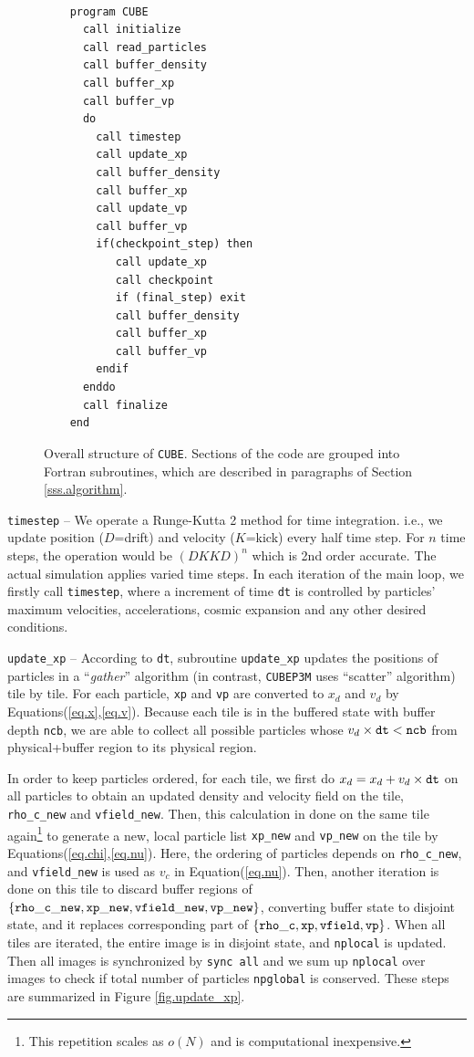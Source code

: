 \documentclass[10pt,twocolumn,preprint]{emulateapj}
\begin{document}
\begin{figure}[t]
\begin{verbatim}

    program CUBE
      call initialize
      call read_particles
      call buffer_density
      call buffer_xp
      call buffer_vp
      do
        call timestep
        call update_xp
        call buffer_density
        call buffer_xp
        call update_vp
        call buffer_vp
        if(checkpoint_step) then
           call update_xp
           call checkpoint
           if (final_step) exit
           call buffer_density
           call buffer_xp
           call buffer_vp
        endif
      enddo
      call finalize
    end
\end{verbatim}
\caption{Overall structure of {\tt CUBE}. Sections of the code are grouped into Fortran subroutines, which are described in paragraphs of Section \ref{sss.algorithm}.}
\label{fig.code}
\end{figure}


{\tt timestep} --
We operate a Runge-Kutta 2 method for time integration. i.e., we update position ($D$=drift) and velocity ($K$=kick) every half time step. For $n$ time steps, the operation would be $(DKKD)^n$ which is 2nd order accurate. The actual simulation applies varied time steps. In each iteration of the main loop, we firstly call {\tt timestep}, where a increment of time {\tt dt} is controlled by particles' maximum velocities, accelerations, cosmic expansion and any other desired conditions.

{\tt update\_xp} --
According to {\tt dt}, subroutine {\tt update\_xp} updates the positions of particles in a ``{\it gather}'' algorithm (in contrast, {\tt CUBEP3M} uses ``scatter'' algorithm) tile by tile. For each particle, {\tt xp} and {\tt vp} are converted to $x_d$ and $v_d$ by Equations(\ref{eq.x},\ref{eq.v}). Because each tile is in the buffered state with buffer depth {\tt ncb}, we are able to collect all possible particles whose $v_d\times{\tt dt}<{\tt ncb}$ from physical+buffer region to its physical region.

In order to keep particles ordered, for each tile, we first do $x_d=x_d+v_d\times{\tt dt}$ on all particles to obtain an updated density and velocity field on the tile, {\tt rho\_c\_new} and {\tt vfield\_new}. Then, this calculation in done on the same tile again\footnote{This repetition scales as $o(N)$ and is computational inexpensive.} to generate a new, local particle list {\tt xp\_new} and {\tt vp\_new} on the tile by Equations(\ref{eq.chi},\ref{eq.nu}). Here, the ordering of particles depends on {\tt rho\_c\_new}, and {\tt vfield\_new} is used as $v_c$ in Equation(\ref{eq.nu}). Then, another iteration is done on this tile to discard buffer regions of $\{{\tt rho\_c\_new},{\tt xp\_new},{\tt vfield\_new},{\tt vp\_new}\}$, converting buffer state to disjoint state, and it replaces corresponding part of $\{{\tt rho\_c},{\tt xp},{\tt vfield},{\tt vp}\}$. When all tiles are iterated, the entire image is in disjoint state, and {\tt nplocal} is updated. Then all images is synchronized by {\tt sync all} and we sum up {\tt nplocal} over images to check if total number of particles {\tt npglobal} is conserved. These steps are summarized in Figure \ref{fig.update_xp}.
\end{document}
